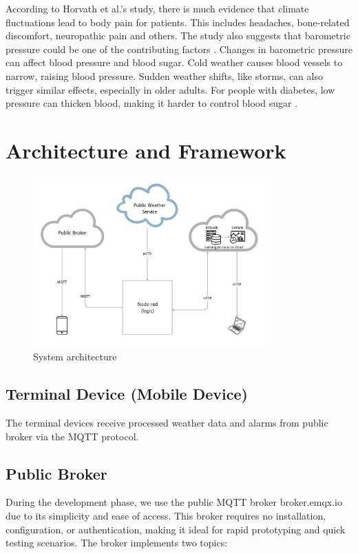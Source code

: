 \documentclass[11pt]{article}
\begin{document}
According to Horvath et al.'s study, there is much evidence that climate fluctuations lead to body pain for patients. This includes headaches, bone-related discomfort, neuropathic pain and others. The study also suggests that barometric pressure could be one of the contributing factors \cite{horvath2023pain}.
Changes in barometric pressure can affect blood pressure and blood sugar. Cold weather causes blood vessels to narrow, raising blood pressure. Sudden weather shifts, like storms, can also trigger similar effects, especially in older adults. For people with diabetes, low pressure can thicken blood, making it harder to control blood sugar \cite{glaser2025feel}.


\section{Architecture and Framework}

\begin{figure}[H]
    \centering
    \includegraphics[width=0.8\textwidth]{pics/architecture.png}
    \caption{System architecture}
\end{figure}

\subsection{Terminal Device (Mobile Device)}
The terminal devices receive processed weather data and alarms from public broker via the MQTT protocol.

\subsection{Public Broker}
During the development phase, we use the public MQTT broker broker.emqx.io due to its simplicity and ease of access. This broker requires no installation, configuration, or authentication, making it ideal for rapid prototyping and quick testing scenarios. The broker implements two topics:
\end{document}

